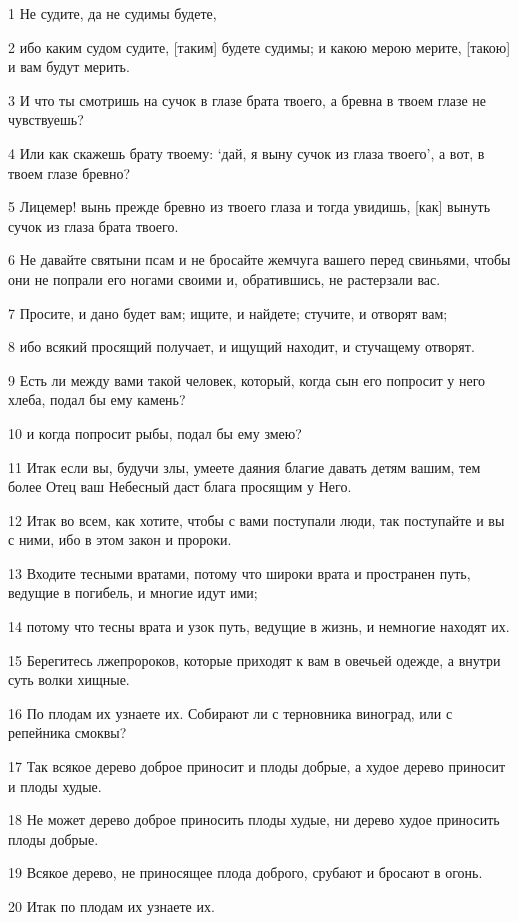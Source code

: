 \par 1 Не судите, да не судимы будете,
\par 2 ибо каким судом судите, [таким] будете судимы; и какою мерою мерите, [такою] и вам будут мерить.
\par 3 И что ты смотришь на сучок в глазе брата твоего, а бревна в твоем глазе не чувствуешь?
\par 4 Или как скажешь брату твоему: `дай, я выну сучок из глаза твоего', а вот, в твоем глазе бревно?
\par 5 Лицемер! вынь прежде бревно из твоего глаза и тогда увидишь, [как] вынуть сучок из глаза брата твоего.
\par 6 Не давайте святыни псам и не бросайте жемчуга вашего перед свиньями, чтобы они не попрали его ногами своими и, обратившись, не растерзали вас.
\par 7 Просите, и дано будет вам; ищите, и найдете; стучите, и отворят вам;
\par 8 ибо всякий просящий получает, и ищущий находит, и стучащему отворят.
\par 9 Есть ли между вами такой человек, который, когда сын его попросит у него хлеба, подал бы ему камень?
\par 10 и когда попросит рыбы, подал бы ему змею?
\par 11 Итак если вы, будучи злы, умеете даяния благие давать детям вашим, тем более Отец ваш Небесный даст блага просящим у Него.
\par 12 Итак во всем, как хотите, чтобы с вами поступали люди, так поступайте и вы с ними, ибо в этом закон и пророки.
\par 13 Входите тесными вратами, потому что широки врата и пространен путь, ведущие в погибель, и многие идут ими;
\par 14 потому что тесны врата и узок путь, ведущие в жизнь, и немногие находят их.
\par 15 Берегитесь лжепророков, которые приходят к вам в овечьей одежде, а внутри суть волки хищные.
\par 16 По плодам их узнаете их. Собирают ли с терновника виноград, или с репейника смоквы?
\par 17 Так всякое дерево доброе приносит и плоды добрые, а худое дерево приносит и плоды худые.
\par 18 Не может дерево доброе приносить плоды худые, ни дерево худое приносить плоды добрые.
\par 19 Всякое дерево, не приносящее плода доброго, срубают и бросают в огонь.
\par 20 Итак по плодам их узнаете их.
